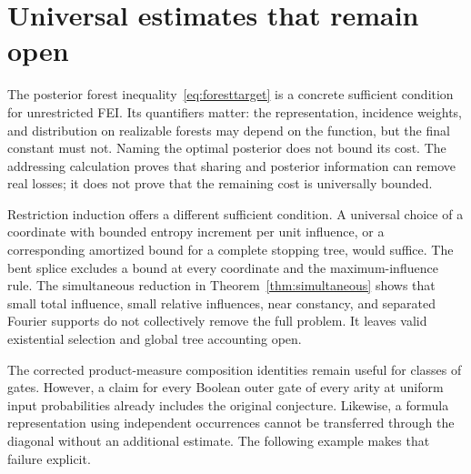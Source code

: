 \section{Universal estimates that remain open}\label{sec:remaining}

The posterior forest inequality~\eqref{eq:foresttarget} is a concrete sufficient condition for unrestricted FEI. Its quantifiers matter: the representation, incidence weights, and distribution on realizable forests may depend on the function, but the final constant must not. Naming the optimal posterior does not bound its cost. The addressing calculation proves that sharing and posterior information can remove real losses; it does not prove that the remaining cost is universally bounded.

Restriction induction offers a different sufficient condition. A universal choice of a coordinate with bounded entropy increment per unit influence, or a corresponding amortized bound for a complete stopping tree, would suffice. The bent splice excludes a bound at every coordinate and the maximum-influence rule. The simultaneous reduction in Theorem~\ref{thm:simultaneous} shows that small total influence, small relative influences, near constancy, and separated Fourier supports do not collectively remove the full problem. It leaves valid existential selection and global tree accounting open.

The corrected product-measure composition identities remain useful for classes of gates. However, a claim for every Boolean outer gate of every arity at uniform input probabilities already includes the original conjecture. Likewise, a formula representation using independent occurrences cannot be transferred through the diagonal without an additional estimate. The following example makes that failure explicit.


